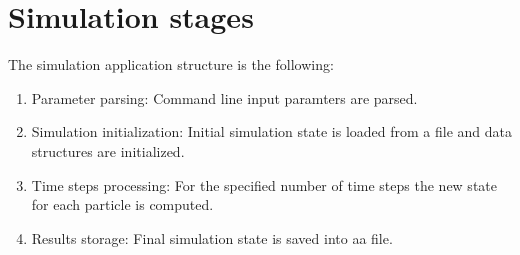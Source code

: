 \section{Simulation stages}

The simulation application structure is the following:

\begin{enumerate}
\item Parameter parsing: Command line input paramters are parsed.
\item Simulation initialization: Initial simulation state is loaded from a file
and data structures are initialized.
\item Time steps processing: For the specified number of time steps the new
state for each particle is computed.
\item Results storage: Final simulation state is saved into aa file.
\end{enumerate}





